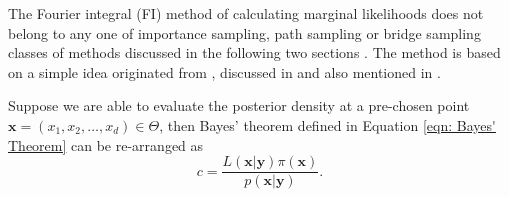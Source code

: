 \documentclass[%
 reprint,
 amsmath,amssymb,
 aps,
]{revtex4-2}
\def\btheta{\boldsymbol{\theta}}
\def\btheta{\boldsymbol{\theta}}
\def\ybold{\mathbf{y}}
\def\xbold{\mathbf{x}}
\newcommand{\btheta}{\mbox{\boldmath $\theta$}}
\begin{document}
The Fourier integral (FI) method of calculating marginal likelihoods does not belong to any one of importance sampling, path sampling or bridge sampling classes of methods discussed in the following two sections . The method is based on a simple idea originated from \cite{chib1995marginal}, discussed in \cite{chib2001marginal} and also mentioned in \cite{raftery1995hypothesis}. 

Suppose we are able to evaluate the posterior density at a pre-chosen point $\mathbf{x} = (x_1, x_2, \ldots, x_d) \in \Theta$, then Bayes' theorem  defined in Equation \eqref{eqn: Bayes' Theorem} can be re-arranged as
\begin{equation} \label{eqn: re-arranged Bayes' Theorem for FI method}
    c = \frac{L(\xbold | \ybold)\pi(\xbold)}{p(\xbold | \ybold)}.
\end{equation}

\end{document}
